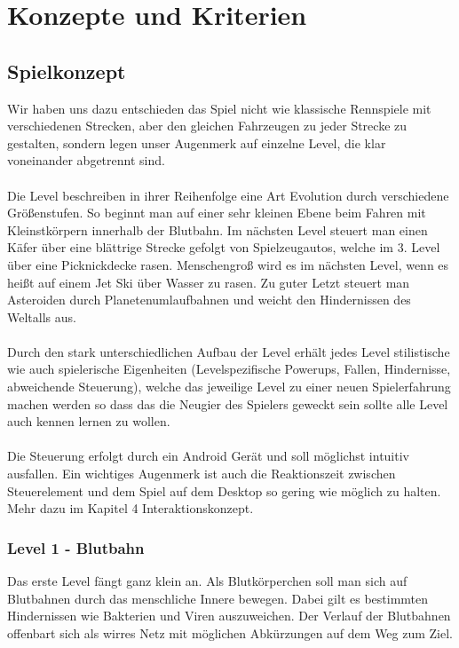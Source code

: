 \section{Konzepte und Kriterien}

\subsection{Spielkonzept}

Wir haben uns dazu entschieden das Spiel nicht wie klassische Rennspiele mit verschiedenen Strecken, aber den gleichen Fahrzeugen zu jeder Strecke zu gestalten, sondern legen unser Augenmerk auf einzelne Level, die klar voneinander abgetrennt sind.\\
\\
Die Level beschreiben in ihrer Reihenfolge eine Art Evolution durch verschiedene Größenstufen. So beginnt man auf einer sehr kleinen Ebene beim Fahren mit Kleinstkörpern innerhalb der Blutbahn. Im nächsten Level steuert man einen Käfer über eine blättrige Strecke gefolgt von Spielzeugautos, welche im 3. Level über eine Picknickdecke rasen. Menschengroß wird es im nächsten Level, wenn es heißt auf einem Jet Ski über Wasser zu rasen. Zu guter Letzt steuert man Asteroiden durch Planetenumlaufbahnen und weicht den Hindernissen des Weltalls aus.\\
\\
Durch den stark unterschiedlichen Aufbau der Level erhält jedes Level stilistische wie auch spielerische Eigenheiten (Levelspezifische Powerups, Fallen, Hindernisse, abweichende Steuerung), welche das jeweilige Level zu einer neuen Spielerfahrung machen werden so dass das die Neugier des Spielers geweckt sein sollte alle Level auch kennen lernen zu wollen.\\
\\
Die Steuerung erfolgt durch ein Android Gerät und soll möglichst intuitiv ausfallen. Ein wichtiges Augenmerk ist auch die Reaktionszeit zwischen Steuerelement und dem Spiel auf dem Desktop so gering wie möglich zu halten. Mehr dazu im Kapitel 4 Interaktionskonzept.\\

\subsubsection{Level 1 - Blutbahn}

Das erste Level fängt ganz klein an. Als Blutkörperchen soll man sich auf Blutbahnen durch das menschliche Innere bewegen. Dabei gilt es bestimmten Hindernissen wie Bakterien und Viren auszuweichen. Der Verlauf der Blutbahnen offenbart sich als wirres Netz mit möglichen Abkürzungen auf dem Weg zum Ziel.

